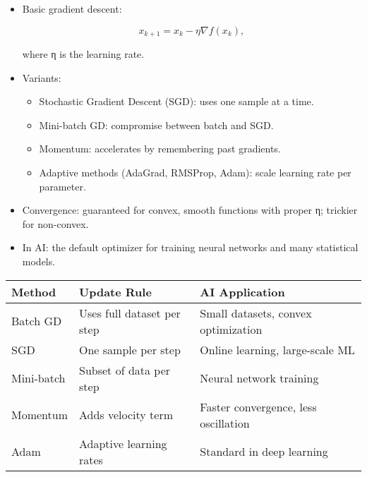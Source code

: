 \documentclass[
  letterpaper,
  DIV=11,
  numbers=noendperiod]{scrreprt}
\providecommand{\tightlist}{%
  \setlength{\itemsep}{0pt}\setlength{\parskip}{0pt}}
\begin{document}
\begin{itemize}
\item
  Basic gradient descent:

  \[
  x_{k+1} = x_k - η \nabla f(x_k),
  \]

  where η is the learning rate.
\item
  Variants:

  \begin{itemize}
  \tightlist
  \item
    Stochastic Gradient Descent (SGD): uses one sample at a time.
  \item
    Mini-batch GD: compromise between batch and SGD.
  \item
    Momentum: accelerates by remembering past gradients.
  \item
    Adaptive methods (AdaGrad, RMSProp, Adam): scale learning rate per
    parameter.
  \end{itemize}
\item
  Convergence: guaranteed for convex, smooth functions with proper η;
  trickier for non-convex.
\item
  In AI: the default optimizer for training neural networks and many
  statistical models.
\end{itemize}

\begin{longtable}[]{@{}
  >{\raggedright\arraybackslash}p{}
  >{\raggedright\arraybackslash}p{}
  >{\raggedright\arraybackslash}p{}@{}}
\toprule\noalign{}
\begin{minipage}[b]{\linewidth}\raggedright
Method
\end{minipage} & \begin{minipage}[b]{\linewidth}\raggedright
Update Rule
\end{minipage} & \begin{minipage}[b]{\linewidth}\raggedright
AI Application
\end{minipage} \\
\midrule\noalign{}
\endhead
\bottomrule\noalign{}
\endlastfoot
Batch GD & Uses full dataset per step & Small datasets, convex
optimization \\
SGD & One sample per step & Online learning, large-scale ML \\
Mini-batch & Subset of data per step & Neural network training \\
Momentum & Adds velocity term & Faster convergence, less oscillation \\
Adam & Adaptive learning rates & Standard in deep learning \\
\end{longtable}
\end{document}
